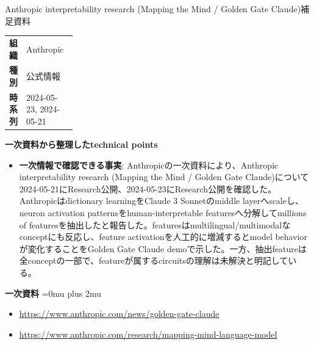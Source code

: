 \begin{technicalnote}{Anthropic interpretability research (Mapping the Mind / Golden Gate Claude)}{補足資料}
\begingroup
\begin{tabularx}{\linewidth}{@{}>{\bfseries}p{0.22\linewidth}X@{}}
組織 & Anthropic \\
種別 & 公式情報 \\
時系列 & 2024-05-23, 2024-05-21 \\
\end{tabularx}
\smallskip
{\bfseries 一次資料から整理したtechnical points}
\begin{itemize}[leftmargin=1.5em,itemsep=0.35em]
\item \textbf{一次情報で確認できる事実}: Anthropicの一次資料により、Anthropic interpretability research (Mapping the Mind / Golden Gate Claude)について2024-05-21にResearch公開、2024-05-23にResearch公開を確認した。 Anthropicはdictionary learningをClaude 3 Sonnetのmiddle layerへscaleし、neuron activation patternsをhuman-interpretable featuresへ分解してmillions of featuresを抽出したと報告した。featuresはmultilingual/multimodalなconceptにも反応し、feature activationを人工的に増減するとmodel behaviorが変化することをGolden Gate Claude demoで示した。一方、抽出featureは全conceptの一部で、featureが属するcircuitsの理解は未解決と明記している。
\end{itemize}
\begin{minipage}{\linewidth}
\begin{samepage}
{\bfseries 一次資料}
\begingroup\sloppy
\Urlmuskip=0mu plus 2mu\relax
\begin{itemize}[leftmargin=1.5em,itemsep=0.25em]
\item {\scriptsize\url{https://www.anthropic.com/news/golden-gate-claude}}
\item {\scriptsize\url{https://www.anthropic.com/research/mapping-mind-language-model}}
\end{itemize}
\endgroup
\end{samepage}
\end{minipage}
\endgroup
\end{technicalnote}
\medskip

